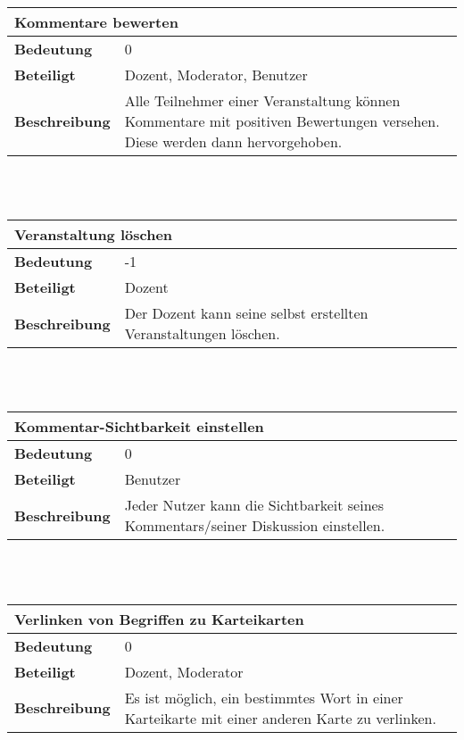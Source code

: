 \documentclass[12pt,a4paper]{article}
\begin{document}
\begin{tabular}{l p{10cm}}
\multicolumn{2}{l}{\textbf{Kommentare bewerten}} \\ \hline
\textbf{Bedeutung} & 0 \\ \hline 
\textbf{Beteiligt} & Dozent, Moderator, Benutzer \\ \hline 
\textbf{Beschreibung} & Alle Teilnehmer einer Veranstaltung können Kommentare mit positiven Bewertungen versehen. Diese werden dann hervorgehoben.\\ 
\hline 
\end{tabular}\\\\

\begin{tabular}{l p{10cm}}
\multicolumn{2}{l}{\textbf{Veranstaltung löschen}} \\ \hline
\textbf{Bedeutung} & -1 \\ \hline 
\textbf{Beteiligt} & Dozent \\ \hline 
\textbf{Beschreibung} & Der Dozent kann seine selbst erstellten Veranstaltungen löschen.\\ 
\hline 
\end{tabular}\\\\

\begin{tabular}{l p{10cm}}
\multicolumn{2}{l}{\textbf{Kommentar-Sichtbarkeit einstellen}} \\ \hline
\textbf{Bedeutung} & 0 \\ \hline 
\textbf{Beteiligt} & Benutzer \\ \hline 
\textbf{Beschreibung} & Jeder Nutzer kann die Sichtbarkeit seines Kommentars/seiner Diskussion einstellen.\\ 
\hline 
\end{tabular}\\\\

\begin{tabular}{l p{10cm}}
\multicolumn{2}{l}{\textbf{Verlinken von Begriffen zu Karteikarten}} \\ \hline
\textbf{Bedeutung} & 0 \\ \hline 
\textbf{Beteiligt} & Dozent, Moderator \\ \hline 
\textbf{Beschreibung} & Es ist möglich, ein bestimmtes Wort in einer Karteikarte mit einer anderen Karte zu verlinken. \\ 
\hline 
\end{tabular}\\\\
\end{document}
